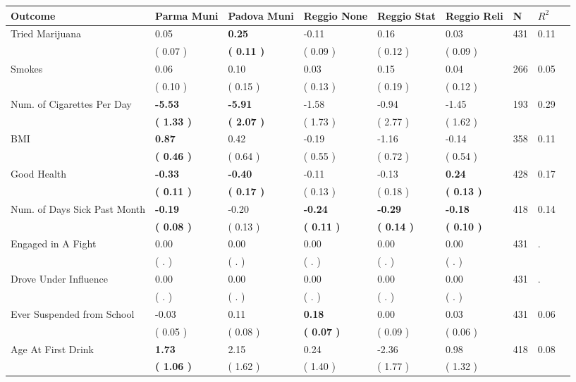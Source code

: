 \begin{tabular}{L{6.2cm} C{1.8cm} C{1.8cm} C{1.8cm} C{1.8cm} C{1.8cm} C{1.8cm} C{0.3cm} C{0.3cm}}
\toprule
 \textbf{Outcome} & \textbf{Parma Muni} & \textbf{Padova Muni} & \textbf{Reggio None} & \textbf{Reggio Stat} & \textbf{Reggio Reli} & \textbf{N} & \textbf{$ R^2$} \\
\midrule
Tried Marijuana &      0.05 & \textbf{     0.25} &     -0.11 &      0.16 &      0.03  & 431 &       0.11 \\ 
 & (     0.07 ) & \textbf{(     0.11 )} & (     0.09 ) & (     0.12 ) & (     0.09 )  & \\
Smokes &      0.06 &      0.10 &      0.03 &      0.15 &      0.04  & 266 &       0.05 \\ 
 & (     0.10 ) & (     0.15 ) & (     0.13 ) & (     0.19 ) & (     0.12 )  & \\
Num. of Cigarettes Per Day & \textbf{    -5.53} & \textbf{    -5.91} &     -1.58 &     -0.94 &     -1.45  & 193 &       0.29 \\ 
 & \textbf{(     1.33 )} & \textbf{(     2.07 )} & (     1.73 ) & (     2.77 ) & (     1.62 )  & \\
BMI & \textbf{     0.87} &      0.42 &     -0.19 &     -1.16 &     -0.14  & 358 &       0.11 \\ 
 & \textbf{(     0.46 )} & (     0.64 ) & (     0.55 ) & (     0.72 ) & (     0.54 )  & \\
Good Health & \textbf{    -0.33} & \textbf{    -0.40} &     -0.11 &     -0.13 & \textbf{     0.24}  & 428 &       0.17 \\ 
 & \textbf{(     0.11 )} & \textbf{(     0.17 )} & (     0.13 ) & (     0.18 ) & \textbf{(     0.13 )}  & \\
Num. of Days Sick Past Month & \textbf{    -0.19} &     -0.20 & \textbf{    -0.24} & \textbf{    -0.29} & \textbf{    -0.18}  & 418 &       0.14 \\ 
 & \textbf{(     0.08 )} & (     0.13 ) & \textbf{(     0.11 )} & \textbf{(     0.14 )} & \textbf{(     0.10 )}  & \\
Engaged in A Fight &      0.00 &      0.00 &      0.00 &      0.00 &      0.00  & 431 &          . \\ 
 & (        . ) & (        . ) & (        . ) & (        . ) & (        . )  & \\
Drove Under Influence &      0.00 &      0.00 &      0.00 &      0.00 &      0.00  & 431 &          . \\ 
 & (        . ) & (        . ) & (        . ) & (        . ) & (        . )  & \\
Ever Suspended from School &     -0.03 &      0.11 & \textbf{     0.18} &      0.00 &      0.03  & 431 &       0.06 \\ 
 & (     0.05 ) & (     0.08 ) & \textbf{(     0.07 )} & (     0.09 ) & (     0.06 )  & \\
Age At First Drink & \textbf{     1.73} &      2.15 &      0.24 &     -2.36 &      0.98  & 418 &       0.08 \\ 
 & \textbf{(     1.06 )} & (     1.62 ) & (     1.40 ) & (     1.77 ) & (     1.32 )  & \\
\bottomrule
\end{tabular}
